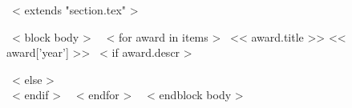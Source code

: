~< extends "section.tex" >~

~< block body >~
~< for award in items >~
  << award.title >> \hfill {\small \color{teal} << award['year'] >>}
  ~< if award.descr >~
    \\ {\scriptsize \color{gray}{<< award.descr >>} \par}
  ~< else >~
    \\[0.5mm]
  ~< endif >~ \vspace*{0.2cm}
~< endfor >~
\vspace*{-0.5cm}
~< endblock body >~
